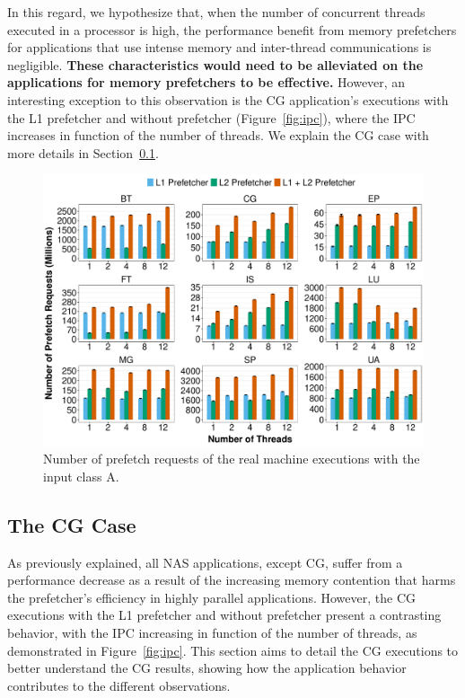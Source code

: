 \documentclass[AMA,final,STIX1COL]{WileyNJD-v2}
\newcommand\new[1]{{\color{red}\textbf{#1}}}
\begin{document}
In this regard, we hypothesize that, when the number of concurrent threads executed in a processor is high, the performance benefit from memory prefetchers for applications that use intense memory and inter-thread communications is negligible. 
\new{These characteristics would need to be alleviated on the applications for memory prefetchers to be effective.} 
However, an interesting exception to this observation is the CG application's executions with the L1 prefetcher and without prefetcher (Figure~\ref{fig:ipc}), where the IPC increases in function of the number of threads. 
We explain the CG case with more details in Section~\ref{subs:cg}.

\begin{figure}[!htb]
    \centering
    \includegraphics[width=\linewidth]{figures/fig3.pdf}
    \caption{Number of prefetch requests of the real machine executions with the input class A.}
    \label{fig:real_l2-rqsts-all-pf}
\end{figure}



\subsection{The CG Case}\label{subs:cg}


As previously explained, all NAS applications, except CG, suffer from a performance decrease as a result of the increasing memory contention that harms the prefetcher's efficiency in highly parallel applications.
However, the CG executions with the L1 prefetcher and without prefetcher present a contrasting behavior, with the IPC increasing in function of the number of threads, as demonstrated in Figure~\ref{fig:ipc}.
This section aims to detail the CG executions to better understand the CG results, showing how the application behavior contributes to the different observations. 
\end{document}
